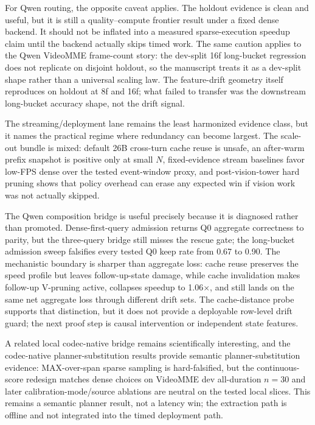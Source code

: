 For Qwen routing, the opposite caveat applies. The holdout evidence is clean
and useful, but it is still a quality--compute frontier result under a fixed
dense backend. It should not be inflated into a measured sparse-execution
speedup claim until the backend actually skips timed work. The same caution
applies to the Qwen VideoMME frame-count story: the dev-split 16f long-bucket
regression does not replicate on disjoint holdout, so the manuscript treats it
as a dev-split shape rather than a universal scaling law. The feature-drift
geometry itself reproduces on holdout at 8f and 16f; what failed to
transfer was the downstream long-bucket accuracy shape, not the drift signal.

The streaming/deployment lane remains the least harmonized evidence class, but
it names the practical regime where redundancy can become largest. The
scale-out bundle is mixed: default 26B cross-turn cache reuse is unsafe, an
after-warm prefix snapshot is positive only at small \(N\), fixed-evidence
stream baselines favor low-FPS dense over the tested event-window proxy, and
post-vision-tower hard pruning shows that policy overhead can erase any
expected win if vision work was not actually skipped.

The Qwen composition bridge is useful precisely because it is diagnosed rather
than promoted. Dense-first-query admission returns Q0 aggregate correctness to
parity,
but the three-query bridge still misses the rescue gate; the long-bucket
admission sweep falsifies every tested Q0 keep rate from 0.67 to 0.90. The
mechanistic boundary is sharper than aggregate loss: cache reuse preserves the
speed profile but leaves follow-up-state damage, while cache invalidation makes
follow-up V-pruning active, collapses speedup to 1.06$\times$, and still lands
on the same net aggregate loss through different drift sets. The cache-distance
probe supports that distinction, but it does not provide a deployable row-level
drift guard; the next proof step is causal intervention or independent state
features.

A related local codec-native bridge remains scientifically interesting, and
the codec-native planner-substitution results provide semantic
planner-substitution evidence: MAX-over-span sparse sampling is hard-falsified,
but the continuous-score redesign matches dense choices on VideoMME dev
all-duration \(n=30\) and later calibration-mode/source ablations are neutral
on the tested local slices. This remains a semantic planner result, not a
latency win; the extraction path is offline and not integrated into the timed
deployment path.

